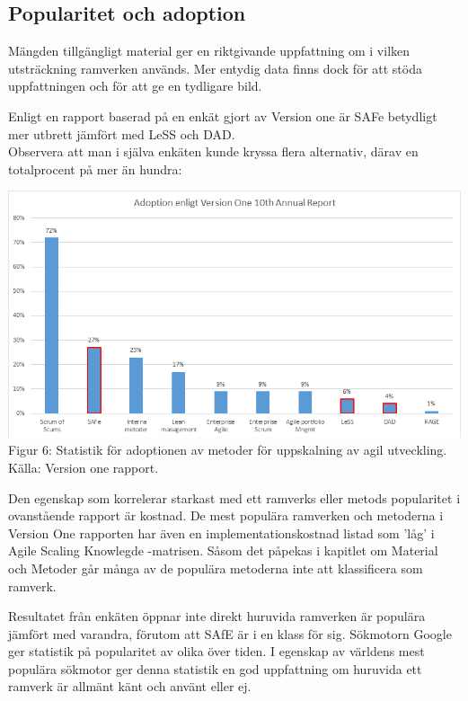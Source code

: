 	\subsection{Popularitet och adoption}
	
		Mängden tillgängligt material ger en riktgivande uppfattning om i vilken utsträckning ramverken används. Mer entydig data finns dock för att stöda uppfattningen och för att ge en tydligare bild.
		
		Enligt en rapport baserad på en enkät gjort av Version one är SAFe betydligt mer utbrett jämfört med LeSS och DAD. \cite{version_one_report} \\	
		
		Observera att man i själva enkäten kunde kryssa flera alternativ, därav en totalprocent på mer än hundra:
		
		\begin{center}
			\includegraphics{Grafer/AnnualReport_Adoption.png}
			\\Figur 6: Statistik för adoptionen av metoder för uppskalning av agil utveckling. Källa: Version one rapport. \cite{version_one_report}
		\end{center}
		
	
		Den egenskap som korrelerar starkast med ett ramverks eller metods popularitet i ovanstående rapport är kostnad. De mest populära ramverken och metoderna i Version One rapporten har även en implementationskostnad listad som 'låg' i Agile Scaling Knowlegde -matrisen. \cite{ask_matrix}				
		Såsom det påpekas i kapitlet om Material och Metoder går många av de populära metoderna inte att klassificera som ramverk. 
		
		
		Resultatet från enkäten öppnar inte direkt huruvida ramverken är populära jämfört med varandra, förutom att SAfE är i en klass för sig. Sökmotorn Google ger statistik på popularitet av olika över tiden. I egenskap av världens mest populära sökmotor ger denna statistik en god uppfattning om huruvida ett ramverk är allmänt känt och använt eller ej. 
		
